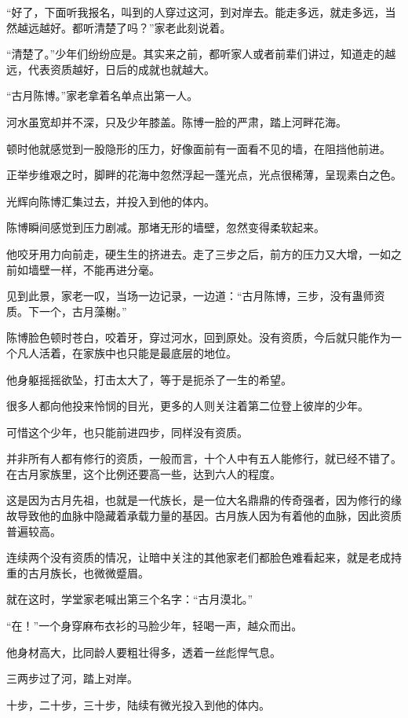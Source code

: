 \begin{this_body}
“好了，下面听我报名，叫到的人穿过这河，到对岸去。能走多远，就走多远，当然越远越好。都听清楚了吗？”家老此刻说着。

“清楚了。”少年们纷纷应是。其实来之前，都听家人或者前辈们讲过，知道走的越远，代表资质越好，日后的成就也就越大。

“古月陈博。”家老拿着名单点出第一人。

河水虽宽却并不深，只及少年膝盖。陈博一脸的严肃，踏上河畔花海。

顿时他就感觉到一股隐形的压力，好像面前有一面看不见的墙，在阻挡他前进。

正举步维艰之时，脚畔的花海中忽然浮起一蓬光点，光点很稀薄，呈现素白之色。

光辉向陈博汇集过去，并投入到他的体内。

陈博瞬间感觉到压力剧减。那堵无形的墙壁，忽然变得柔软起来。

他咬牙用力向前走，硬生生的挤进去。走了三步之后，前方的压力又大增，一如之前如墙壁一样，不能再进分毫。

见到此景，家老一叹，当场一边记录，一边道：“古月陈博，三步，没有蛊师资质。下一个，古月藻榭。”

陈博脸色顿时苍白，咬着牙，穿过河水，回到原处。没有资质，今后就只能作为一个凡人活着，在家族中也只能是最底层的地位。

他身躯摇摇欲坠，打击太大了，等于是扼杀了一生的希望。

很多人都向他投来怜悯的目光，更多的人则关注着第二位登上彼岸的少年。

可惜这个少年，也只能前进四步，同样没有资质。

并非所有人都有修行的资质，一般而言，十个人中有五人能修行，就已经不错了。在古月家族里，这个比例还要高一些，达到六人的程度。

这是因为古月先祖，也就是一代族长，是一位大名鼎鼎的传奇强者，因为修行的缘故导致他的血脉中隐藏着承载力量的基因。古月族人因为有着他的血脉，因此资质普遍较高。

连续两个没有资质的情况，让暗中关注的其他家老们都脸色难看起来，就是老成持重的古月族长，也微微蹙眉。

就在这时，学堂家老喊出第三个名字：“古月漠北。”

“在！”一个身穿麻布衣衫的马脸少年，轻喝一声，越众而出。

他身材高大，比同龄人要粗壮得多，透着一丝彪悍气息。

三两步过了河，踏上对岸。

十步，二十步，三十步，陆续有微光投入到他的体内。


\end{this_body}
